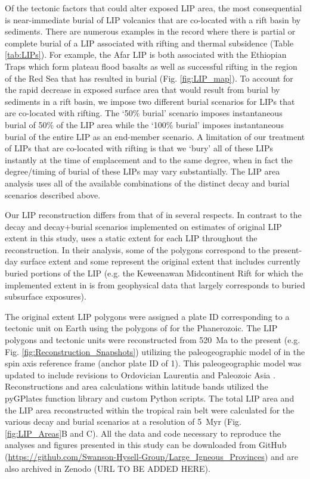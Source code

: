 \documentclass[11pt,letterpaper]{article}
\begin{document}
Of the tectonic factors that could alter exposed LIP area, the most consequential is near-immediate burial of LIP volcanics that are co-located with a rift basin by sediments. There are numerous examples in the record where there is partial or complete burial of a LIP associated with rifting and thermal subsidence (Table \ref{tab:LIPs}). For example, the Afar LIP is both associated with the Ethiopian Traps which form plateau flood basalts as well as successful rifting in the region of the Red Sea that has resulted in burial (Fig. \ref{fig:LIP_map}). To account for the rapid decrease in exposed surface area that would result from burial by sediments in a rift basin, we impose two different burial scenarios for LIPs that are co-located with rifting. The `50\% burial' scenario imposes instantaneous burial of 50$\%$ of the LIP area while the `100\% burial' imposes instantaneous burial of the entire LIP as an end-member scenario. A limitation of our treatment of LIPs that are co-located with rifting is that we `bury' all of these LIPs instantly at the time of emplacement and to the same degree, when in fact the degree/timing of burial of these LIPs may vary substantially. The LIP area analysis uses all of the available combinations of the distinct decay and burial scenarios described above. 

Our LIP reconstruction differs from that of \citet{Johansson2018a} in several respects. In contrast to the decay and decay+burial scenarios implemented on estimates of original LIP extent in this study, \citet{Johansson2018a} uses a static extent for each LIP throughout the reconstruction. In their analysis, some of the polygons correspond to the present-day surface extent and some represent the original extent that includes currently buried portions of the LIP (e.g. the Keweenawan Midcontinent Rift for which the implemented extent in \citet{Johansson2018a} is from geophysical data that largely corresponds to buried subsurface exposures).

The original extent LIP polygons were assigned a plate ID corresponding to a tectonic unit on Earth using the polygons of \citet{Torsvik2016a} for the Phanerozoic. The LIP polygons and tectonic units were reconstructed from 520~Ma to the present (e.g. Fig. \ref{fig:Reconstruction_Snapshots}) utilizing the paleogeographic model of \citet{Torsvik2016a} in the spin axis reference frame (anchor plate ID of 1). This paleogeographic model was updated to include revisions to Ordovician Laurentia \citep{Swanson-Hysell2017a} and Paleozoic Asia \citep{Domeier2018a}. Reconstructions and area calculations within latitude bands utilized the pyGPlates function library and custom Python scripts. The total LIP area and the LIP area reconstructed within the tropical rain belt were calculated for the various decay and burial scenarios at a resolution of 5~Myr (Fig. \ref{fig:LIP_Areas}B and C). All the data and code necessary to reproduce the analyses and figures presented in this study can be downloaded from GitHub (\url{https://github.com/Swanson-Hysell-Group/Large_Igneous_Provinces}) and are also archived in Zenodo (URL TO BE ADDED HERE).
\end{document}
